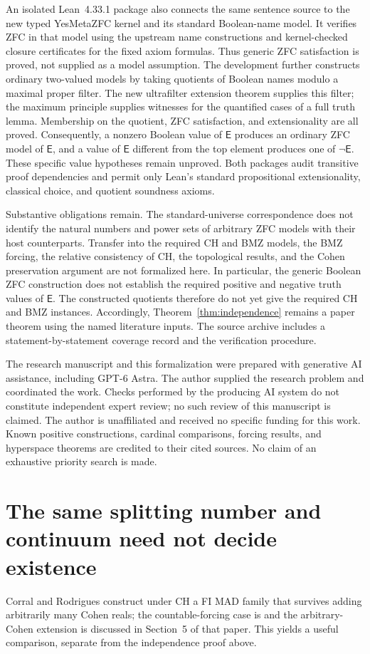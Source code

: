 \documentclass[11pt,letterpaper]{article}
\theoremstyle{definition}
\theoremstyle{remark}
\newcommand{\E}{\mathsf{E}}
\begin{document}
An isolated Lean~4.33.1 package also connects the same sentence source to
the new typed YesMetaZFC kernel and its standard Boolean-name model.
It verifies ZFC in that model using the upstream name constructions and
kernel-checked closure certificates for the fixed axiom formulas.
Thus generic ZFC satisfaction is proved, not supplied as a model assumption.
The development further constructs ordinary two-valued models by taking
quotients of Boolean names modulo a maximal proper filter. The new
ultrafilter extension theorem supplies this filter; the maximum principle
supplies witnesses for the quantified cases of a full truth lemma.
Membership on the quotient, ZFC satisfaction, and extensionality are all
proved. Consequently, a nonzero Boolean value of $\E$ produces an ordinary
ZFC model of $\E$, and a value of $\E$ different from the top element
produces one of $\neg\E$. These specific value hypotheses remain unproved.
Both packages audit transitive proof dependencies and permit only Lean's
standard propositional extensionality, classical choice, and quotient
soundness axioms.

Substantive obligations remain. The standard-universe correspondence does
not identify the natural numbers and power sets of arbitrary ZFC models
with their host counterparts. Transfer into the required CH and BMZ
models, the BMZ forcing, the relative consistency of CH, the topological
results, and the Cohen preservation argument are not formalized here.
In particular, the generic
Boolean ZFC construction does not establish the required positive and
negative truth values of $\E$. The constructed quotients therefore do not yet give the required
CH and BMZ instances. Accordingly,
Theorem~\ref{thm:independence} remains a paper theorem using the named
literature inputs. The source archive includes a statement-by-statement
coverage record and the verification procedure.

The research manuscript and this formalization were prepared with
generative AI assistance, including GPT-6 Astra. The author supplied the
research problem and coordinated the work. Checks performed by the
producing AI system do not constitute independent expert review; no such
review of this manuscript is claimed. The author is unaffiliated and
received no specific funding for this work. Known positive constructions,
cardinal comparisons, forcing results, and hyperspace theorems are credited
to their cited sources. No claim of an exhaustive priority search is made.

\appendix
\section{The same splitting number and continuum need not decide existence}
Corral and Rodrigues construct under CH a FI MAD family that survives
adding arbitrarily many Cohen reals; the countable-forcing case is
\cite[Theorem~5.3]{CR} and the arbitrary-Cohen extension is discussed in
Section~5 of that paper. This yields a useful comparison, separate from
the independence proof above.
\end{document}

